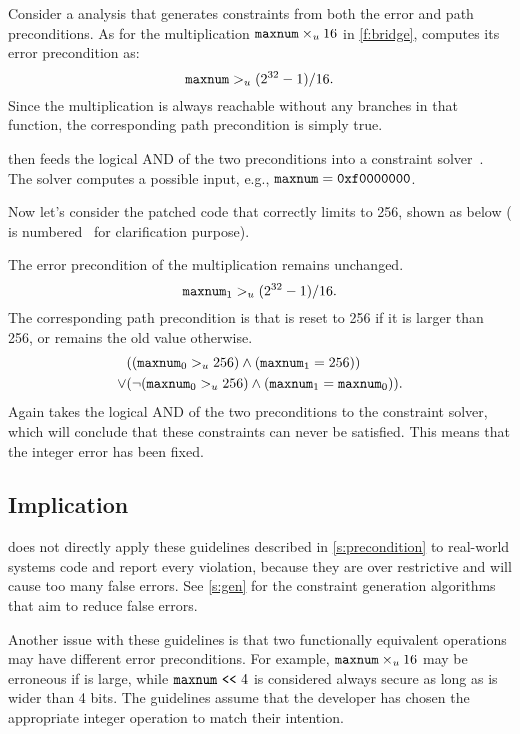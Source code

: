 Consider a \naive analysis that generates constraints from both the
error and path preconditions.  As for the multiplication $\texttt{maxnum}
\times_u 16$ in \autoref{f:bridge}, \sys computes its error
precondition as:
\begin{equation*}
\texttt{maxnum} >_u (2^{32} - 1) / 16.
\end{equation*}
Since the multiplication is always reachable without any branches
in that function, the corresponding path precondition is simply true.

\sys then feeds the logical AND of the two preconditions into a
constraint solver~\cite{boolector}.  The solver computes a possible
input, e.g., $\texttt{maxnum} = \texttt{0xf0000000}$.

Now let's consider the patched code that correctly limits 
to 256, shown as below ( is
numbered~\cite[\chapterautorefname~8.11]{whale} for clarification
purpose).

The error precondition of the multiplication remains unchanged.
\begin{equation*}
\texttt{maxnum}_1 >_u (2^{32} - 1) / 16.
\end{equation*}
The corresponding path precondition is that  is reset to 256
if it is larger than 256, or remains the old value otherwise.
\begin{align*}
& ((\texttt{maxnum}_0 >_u 256) \land (\texttt{maxnum}_1 = 256)) \\
\lor
& (\neg (\texttt{maxnum}_0 >_u 256) \land (\texttt{maxnum}_1 = \texttt{maxnum}_0)).
\end{align*}
Again \sys takes the logical AND of the two preconditions to the
constraint solver, which will conclude that these constraints can
never be satisfied.  This means that the integer error has been
fixed.

\subsection{Implication}
\label{s:imply}

\sys does not directly apply these guidelines described in
\autoref{s:precondition} to real-world systems code and report every
violation, because they are over restrictive and will cause too
many false errors.  See \autoref{s:gen} for the constraint generation
algorithms that aim to reduce false errors.

Another issue with these guidelines is that two functionally
equivalent operations may have different error preconditions.  For
example, $\texttt{maxnum}\times_u 16$ may be erroneous if 
is large, while $\texttt{maxnum} \ \texttt{<}\texttt{<}\  4$ is considered always secure
as long as  is wider than 4 bits.  The guidelines assume
that the developer has chosen the appropriate integer operation to
match their intention.

